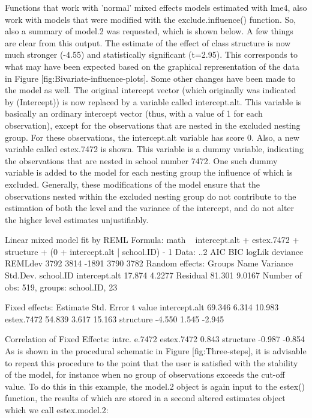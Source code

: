 Functions that work with 'normal' mixed effects models estimated with lme4, also work with models that were modified with the exclude.influence() function. So, also a summary of model.2 was requested, which is shown below. A few things are clear from this output. The estimate of the effect of class structure is now much stronger (-4.55) and statistically significant (t=2.95). This corresponds to what may have been expected based on the graphical representation of the data in Figure [fig:Bivariate-influence-plots]. Some other changes have been made to the model as well. The original intercept vector (which originally was indicated by (Intercept)) is now replaced by a variable called intercept.alt. This variable is basically an ordinary intercept vector (thus, with a value of 1 for each observation), except for the observations that are nested in the excluded nesting group. For these observations, the intercept.alt variable has score 0. Also, a new variable called estex.7472 is shown. This variable is a dummy variable, indicating the observations that are nested in school number 7472. One such dummy variable is added to the model for each nesting group the influence of which is excluded. Generally, these modifications of the model ensure that the observations nested within the excluded nesting group do not contribute to the estimation of both the level and the variance of the intercept, and do not alter the higher level estimates unjustifiably.

Linear mixed model fit by REML 
Formula: math ~ intercept.alt + estex.7472 + structure + 
(0 + intercept.alt | school.ID) - 1 
   Data: ..2 
  AIC  BIC logLik deviance REMLdev
 3792 3814  -1891     3790    3782
Random effects:
 Groups    Name          Variance Std.Dev.
 school.ID intercept.alt 17.874   4.2277  
 Residual                81.301   9.0167  
Number of obs: 519, groups: school.ID, 23

Fixed effects:
              Estimate Std. Error t value
intercept.alt   69.346      6.314  10.983
estex.7472      54.839      3.617  15.163
structure       -4.550      1.545  -2.945

Correlation of Fixed Effects:
           intrc. e.7472
estex.7472  0.843       
structure  -0.987 -0.854
As is shown in the procedural schematic in Figure [fig:Three-steps], it is advisable to repeat this procedure to the point that the user is satisfied with the stability of the model, for instance when no group of observations exceeds the cut-off value. To do this in this example, the model.2 object is again input to the estex() function, the results of which are stored in a second altered estimates object which we call estex.model.2:

